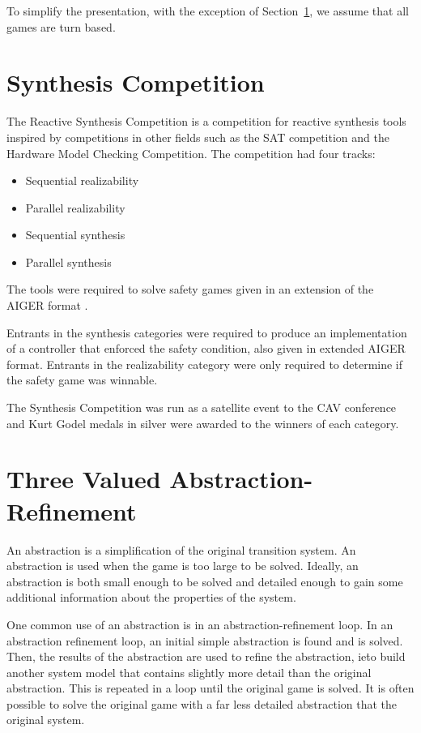 To simplify the presentation, with the exception of Section~\ref{sec:syntcomp}, we assume that all games are turn based.

\section{Synthesis Competition}
\label{sec:syntcomp}

The Reactive Synthesis Competition is a competition for reactive synthesis tools inspired by competitions in other fields such as the SAT competition and the Hardware Model Checking Competition. The competition had four tracks:
\begin{itemize}
    \item Sequential realizability
    \item Parallel realizability
    \item Sequential synthesis
    \item Parallel synthesis
\end{itemize}

The tools were required to solve safety games given in an extension of the AIGER format \cite{aiger}. 

Entrants in the synthesis categories were required to produce an implementation of a controller that enforced the safety condition, also given in extended AIGER format. Entrants in the realizability category were only required to determine if the safety game was winnable.

The Synthesis Competition was run as a satellite event to the CAV conference and Kurt Godel medals in silver were awarded to the winners of each category.



\section{Three Valued Abstraction-Refinement}
An abstraction is a simplification of the original transition system. An abstraction is used when the game is too large to be solved. Ideally, an abstraction is both small enough to be solved and detailed enough to gain some additional information about the properties of the system. 

One common use of an abstraction is in an abstraction-refinement loop. In an abstraction refinement loop, an initial simple abstraction is found and is solved. Then, the results of the abstraction are used to refine the abstraction, ie\. to build another system model that contains slightly more detail than the original abstraction. This is repeated in a loop until the original game is solved. It is often possible to solve the original game with a far less detailed abstraction that the original system. 

